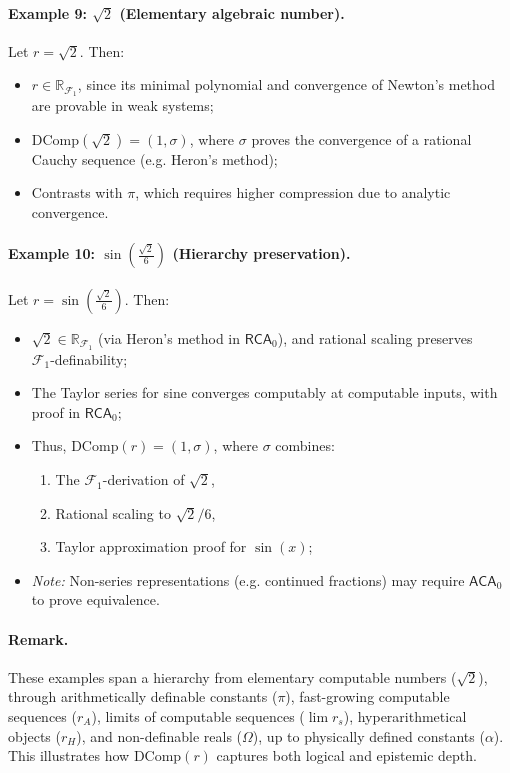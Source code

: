 \documentclass[12pt]{article}
\theoremstyle{definition}
\theoremstyle{plain}
\theoremstyle{remark}
\begin{document}
\paragraph{Example 9: \( \sqrt{2} \) (Elementary algebraic number).}
Let \( r = \sqrt{2} \). Then:
\begin{itemize}
    \item \( r \in \mathbb{R}_{\mathcal{F}_1} \), since its minimal polynomial and convergence of Newton’s method are provable in weak systems;
    \item \( \mathrm{DComp}(\sqrt{2}) = (1, \sigma) \), where \( \sigma \) proves the convergence of a rational Cauchy sequence (e.g. Heron’s method);
    \item Contrasts with \( \pi \), which requires higher compression due to analytic convergence.
\end{itemize}

\paragraph{Example 10: \( \sin\left(\frac{\sqrt{2}}{6}\right) \) (Hierarchy preservation).}
Let \( r = \sin\left(\frac{\sqrt{2}}{6} \right) \). Then:
\begin{itemize}
    \item \( \sqrt{2} \in \mathbb{R}_{\mathcal{F}_1} \) (via Heron's method in \( \mathsf{RCA}_0 \)), and rational scaling preserves \\\( \mathcal{F}_1 \)-definability;
    \item The Taylor series for sine converges computably at computable inputs, with proof in \( \mathsf{RCA}_0 \);
    \item Thus, \( \mathrm{DComp}(r) = (1, \sigma) \), where \( \sigma \) combines:
    \begin{enumerate}
        \item The \( \mathcal{F}_1 \)-derivation of \( \sqrt{2} \),
        \item Rational scaling to \( \sqrt{2}/6 \),
        \item Taylor approximation proof for \( \sin(x) \);
    \end{enumerate}
    \item \emph{Note:} Non-series representations (e.g. continued fractions) may require \( \mathsf{ACA}_0 \) to prove equivalence.
\end{itemize}

\paragraph{Remark.}
These examples span a hierarchy from elementary computable numbers (\( \sqrt{2} \)), through arithmetically definable constants (\( \pi \)), fast-growing computable sequences (\( r_A \)), limits of computable sequences (\( \lim r_s \)), hyperarithmetical objects (\( r_H \)), and non-definable reals (\( \Omega \)), up to physically defined constants (\( \alpha \)). This illustrates how \( \mathrm{DComp}(r) \) captures both logical and epistemic depth.
\end{document}
